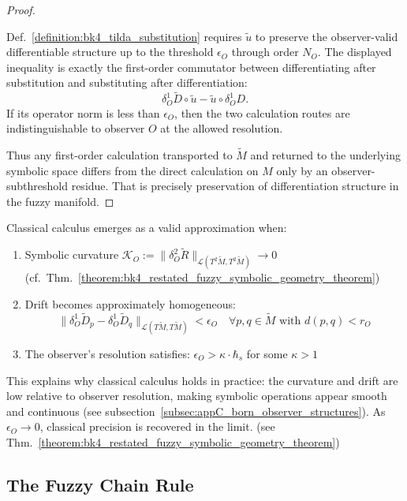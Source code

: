 \begin{proof}
\label{proof:bk4_validity_of_tilda_substit}
\leavevmode

Def.~\ref{definition:bk4_tilda_substitution} requires $\tilde u$ to preserve the
observer-valid differentiable structure up to the threshold $\epsilon_O$ through
order $N_O$. The displayed inequality is exactly the first-order commutator
between differentiating after substitution and substituting after
differentiation:
\[
\delta^1_O \widetilde{D}\circ\tilde u
-
\tilde u\circ\delta^1_O D.
\]
If its operator norm is less than $\epsilon_O$, then the two calculation routes
are indistinguishable to observer $O$ at the allowed resolution.

Thus any first-order calculation transported to $\widetilde M$ and returned to
the underlying symbolic space differs from the direct calculation on $M$ only by
an observer-subthreshold residue. That is precisely preservation of
differentiation structure in the fuzzy manifold.
\end{proof}
\begin{scholium} \label{scholium:bk4_emergence_of_classical_calculus}

Classical calculus emerges as a valid approximation when:
\begin{enumerate}
\item Symbolic curvature $\mathcal{K}_O := \|\delta^2_O \widetilde{R}\|_{\mathcal{L}(T^2\widetilde{M}, T^2\widetilde{M})} \to 0$ (cf.~Thm.~\ref{theorem:bk4_restated_fuzzy_symbolic_geometry_theorem})
\item Drift becomes approximately homogeneous:
\[
\|\delta^1_O \widetilde{D}_p - \delta^1_O \widetilde{D}_q\|_{\mathcal{L}(T\widetilde{M}, T\widetilde{M})} < \epsilon_O \quad \forall p,q \in \widetilde{M} \text{ with } d(p,q) < r_O
\]
\item The observer's resolution satisfies: $\epsilon_O > \kappa \cdot \hbar_s$ for some $\kappa > 1$
\end{enumerate}
This explains why classical calculus holds in practice: the curvature and drift are low relative to observer resolution, making symbolic operations appear smooth and continuous (see subsection~{\ref{subsec:appC_born_observer_structures}}). As $\epsilon_O \to 0$, classical precision is recovered in the limit. (see Thm.~\ref{theorem:bk4_restated_fuzzy_symbolic_geometry_theorem})
\end{scholium}
\subsection[The Fuzzy Chain Rule]{The Fuzzy Chain Rule}
\label{subsec:bk4_fuzzy_chain_rule}

